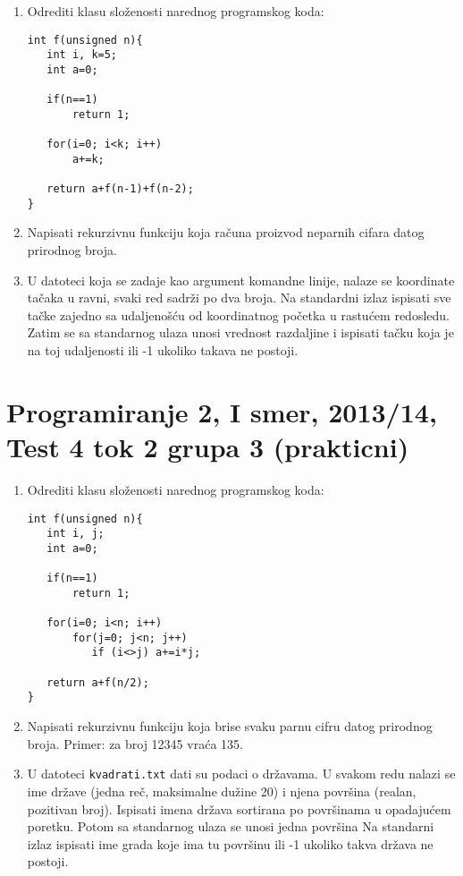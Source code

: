 \begin{enumerate}
\item Odrediti klasu slo\v zenosti narednog programskog koda:
\begin{verbatim}
int f(unsigned n){
   int i, k=5;
   int a=0;

   if(n==1)
       return 1;

   for(i=0; i<k; i++)
       a+=k;

   return a+f(n-1)+f(n-2);
}
\end{verbatim}

\item Napisati rekurzivnu funkciju koja ra\v cuna proizvod neparnih cifara datog
      prirodnog broja.



\item U datoteci koja se zadaje kao argument komandne linije, nalaze se
koordinate ta\v caka u ravni, svaki red sadr\v zi po dva broja. Na
standardni izlaz ispisati sve ta\v cke zajedno sa udaljeno\v s\'cu od
koordinatnog po\v cetka u rastu\'cem redosledu. Zatim se sa standarnog
ulaza unosi vrednost razdaljine i
ispisati ta\v cku koja je na toj udaljenosti ili -1 ukoliko takava ne
postoji.
\end{enumerate}


\section{Programiranje 2, I smer, 2013/14, Test 4 tok 2 grupa 3 (prakticni)}


\begin{enumerate}
\item Odrediti klasu slo\v zenosti narednog programskog koda:
\begin{verbatim}
int f(unsigned n){
   int i, j;
   int a=0;

   if(n==1)
       return 1;

   for(i=0; i<n; i++)
       for(j=0; j<n; j++)
          if (i<>j) a+=i*j;

   return a+f(n/2);
}
\end{verbatim}

\item Napisati rekurzivnu funkciju koja brise svaku parnu cifru datog prirodnog broja.
      Primer: za broj 12345 vra\'ca 135.


\item U datoteci \verb|kvadrati.txt| dati su podaci o dr\v zavama. U svakom redu
      nalazi se ime dr\v zave (jedna re\v c, maksimalne du\v zine 20) i njena povr\v sina
      (realan, pozitivan broj). Ispisati imena dr\v zava sortirana po povr\v sinama
      u opadaju\'cem poretku. Potom sa standarnog ulaza se unosi jedna povr\v sina Na standarni
      izlaz ispisati ime grada koje ima tu povr\v sinu ili -1 ukoliko takva dr\v zava ne postoji.

\end{enumerate}



